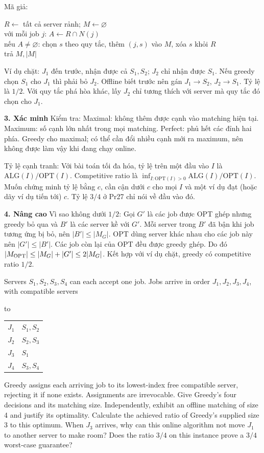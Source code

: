 \documentclass[10pt,a4paper,twocolumn]{article}
\makeatletter
\newcommand{\key}[1]{#1:\enspace}
\newenvironment{examtable}[1]{%
  \par\addvspace{2pt}\noindent\hbox to \linewidth\bgroup\hfil
  \setlength{\tabcolsep}{4pt}%
  \renewcommand{\arraystretch}{1.12}\begin{tabular}{#1}%
}{\end{tabular}\hfil\egroup\par\addvspace{2pt}}
\newcommand{\unitheading}[2]{%
  \par\addvspace{1pt}\noindent\textbf{#1. #2}\enspace}
\newcommand{\unitverification}{\unitheading{3}{Xác minh}}
\newcommand{\unitadvanced}{\unitheading{4}{Nâng cao}}
\newenvironment{algpseudo}{%
  \par\addvspace{2pt}\noindent
  \setlength{\parskip}{0pt}%
  Mã giả:\par\nobreak
  \begin{list}{}{\setlength{\leftmargin}{1em}\setlength{\topsep}{0pt}%
    \setlength{\partopsep}{0pt}\setlength{\parsep}{0pt}%
    \@beginparpenalty=10000\relax}%
  \item\relax
}{\end{list}\par\addvspace{3pt}}
\makeatother
\begin{document}
\begin{algpseudo}
$R\gets$ tất cả server rảnh; $M\gets\varnothing$\\
với mỗi job $j$: $A\gets R\cap N(j)$\\
\quad nếu $A\ne\varnothing$: chọn $s$ theo quy tắc, thêm $(j,s)$ vào $M$, xóa $s$ khỏi $R$\\
trả $M,|M|$
\end{algpseudo}

\key{Ví dụ chặt} $J_1$ đến trước, nhận được cả $S_1,S_2$; $J_2$ chỉ nhận được $S_1$. Nếu greedy chọn $S_1$ cho $J_1$ thì phải bỏ $J_2$. Offline biết trước nên gán $J_1\to S_2$, $J_2\to S_1$. Tỷ lệ là $1/2$. Với quy tắc phá hòa khác, lấy $J_2$ chỉ tương thích với server mà quy tắc đó chọn cho $J_1$.

\unitverification
\key{Kiểm tra} Maximal: không thêm được cạnh vào matching hiện tại. Maximum: số cạnh lớn nhất trong mọi matching. Perfect: phủ hết các đỉnh hai phía. Greedy cho maximal; có thể cần đổi nhiều cạnh mới ra maximum, nên không được làm vậy khi đang chạy online.

\key{Tỷ lệ cạnh tranh} Với bài toán tối đa hóa, tỷ lệ trên một đầu vào $I$ là $\mathrm{ALG}(I)/\mathrm{OPT}(I)$. Competitive ratio là $\inf_{I:\mathrm{OPT}(I)>0}\mathrm{ALG}(I)/\mathrm{OPT}(I)$. Muốn chứng minh tỷ lệ bằng $c$, cần cận dưới $c$ cho mọi $I$ và một ví dụ đạt (hoặc dãy ví dụ tiến tới) $c$. Tỷ lệ $3/4$ ở Pr27 chỉ nói về đầu vào đó.

\unitadvanced
\key{Vì sao không dưới $1/2$} Gọi $G'$ là các job được OPT ghép nhưng greedy bỏ qua và $B'$ là các server kề với $G'$. Mỗi server trong $B'$ đã bận khi job tương ứng bị bỏ, nên $|B'|\le|M_G|$. OPT dùng server khác nhau cho các job này nên $|G'|\le|B'|$. Các job còn lại của OPT đều được greedy ghép. Do đó $|M_{\rm OPT}|\le |M_G|+|G'|\le 2|M_G|$. Kết hợp với ví dụ chặt, greedy có competitive ratio $1/2$.


Servers $S_1,S_2,S_3,S_4$ can each accept one job. Jobs arrive in order $J_1,J_2,J_3,J_4$, with compatible servers
\begin{examtable}{@{}ll@{}}
$J_1$ & $S_1,S_2$\\
$J_2$ & $S_2,S_3$\\
$J_3$ & $S_1$\\
$J_4$ & $S_3,S_4$
\end{examtable}
Greedy assigns each arriving job to its lowest-index free compatible server, rejecting it if none exists. Assignments are irrevocable.
 Give Greedy's four decisions and its matching size.
 Independently, exhibit an offline matching of size 4 and justify its optimality. Calculate the achieved ratio of Greedy's supplied size 3 to this optimum.
 When $J_3$ arrives, why can this online algorithm not move $J_1$ to another server to make room? Does the ratio $3/4$ on this instance prove a $3/4$ worst-case guarantee?
\end{document}
